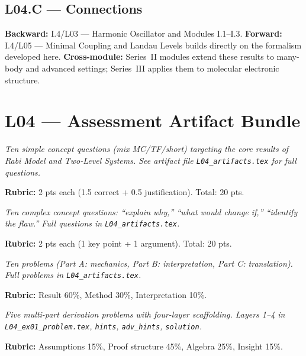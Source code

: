 \subsection*{L04.C — Connections}
\label{sec:L04.C}
\textbf{Backward:} I.4/L03 — Harmonic Oscillator and Modules I.1–I.3.
\textbf{Forward:} I.4/L05 — Minimal Coupling and Landau Levels builds directly on the formalism developed here.
\textbf{Cross-module:} Series~II modules extend these results to many-body and
advanced settings; Series~III applies them to molecular electronic structure.

\newpage
\section*{L04 — Assessment Artifact Bundle}

\begin{tcolorbox}[ugconceptbox, title={SCQU · L04 · Tiers 1–3 · 15–20 min}]
\textit{Ten simple concept questions (mix MC/TF/short) targeting the core results
of Rabi Model and Two-Level Systems. See artifact file \texttt{L04_artifacts.tex} for full questions.}

\textbf{Rubric:} 2 pts each (1.5 correct + 0.5 justification). Total: 20 pts.
\end{tcolorbox}

\begin{tcolorbox}[ugconceptbox, title={CCQU · L04 · Tiers 2–3 · 25–35 min}]
\textit{Ten complex concept questions: ``explain why,'' ``what would change if,''
``identify the flaw.'' Full questions in \texttt{L04_artifacts.tex}.}

\textbf{Rubric:} 2 pts each (1 key point + 1 argument). Total: 20 pts.
\end{tcolorbox}

\begin{tcolorbox}[ugprobbox, title={SPSU · L04 · Tiers 1–3 · 60–90 min}]
\textit{Ten problems (Part A: mechanics, Part B: interpretation, Part C: translation).
Full problems in \texttt{L04_artifacts.tex}.}

\textbf{Rubric:} Result 60\%, Method 30\%, Interpretation 10\%.
\end{tcolorbox}

\begin{tcolorbox}[ugprobbox, title={CPSU · L04 · Tier 3 · 3–6 hrs (4-layer)}]
\textit{Five multi-part derivation problems with four-layer scaffolding.
Layers 1–4 in \texttt{L04_ex01\_problem.tex}, \texttt{hints}, \texttt{adv\_hints}, \texttt{solution}.}

\textbf{Rubric:} Assumptions 15\%, Proof structure 45\%, Algebra 25\%, Insight 15\%.
\end{tcolorbox}

